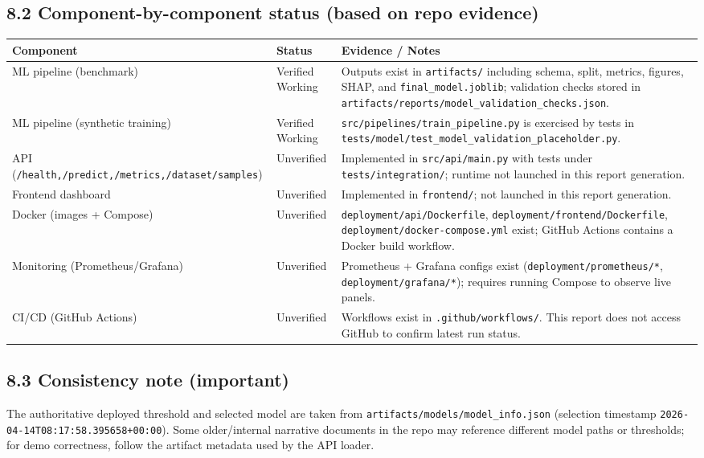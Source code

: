 \documentclass[11pt]{article}
\newcommand{\code}[1]{\texttt{#1}}
\begin{document}
\subsection*{8.2 Component-by-component status (based on repo evidence)}
\begin{longtable}{p{} p{} p{}}
\toprule
\textbf{Component} & \textbf{Status} & \textbf{Evidence / Notes} \\
\midrule
\endhead

ML pipeline (benchmark) & Verified Working & Outputs exist in \code{artifacts/} including schema, split, metrics, figures, SHAP, and \code{final\_model.joblib}; validation checks stored in \code{artifacts/reports/model\_validation\_checks.json}. \\

ML pipeline (synthetic training) & Verified Working & \code{src/pipelines/train\_pipeline.py} is exercised by tests in \code{tests/model/test\_model\_validation\_placeholder.py}. \\

API (\code{/health,/predict,/metrics,/dataset/samples}) & Unverified & Implemented in \code{src/api/main.py} with tests under \code{tests/integration/}; runtime not launched in this report generation. \\

Frontend dashboard & Unverified & Implemented in \code{frontend/}; not launched in this report generation. \\

Docker (images + Compose) & Unverified & \code{deployment/api/Dockerfile}, \code{deployment/frontend/Dockerfile}, \code{deployment/docker-compose.yml} exist; GitHub Actions contains a Docker build workflow. \\

Monitoring (Prometheus/Grafana) & Unverified & Prometheus + Grafana configs exist (\code{deployment/prometheus/*}, \code{deployment/grafana/*}); requires running Compose to observe live panels. \\

CI/CD (GitHub Actions) & Unverified & Workflows exist in \code{.github/workflows/}. This report does not access GitHub to confirm latest run status. \\
\bottomrule
\end{longtable}

\subsection*{8.3 Consistency note (important)}
The authoritative deployed threshold and selected model are taken from \code{artifacts/models/model\_info.json} (selection timestamp \code{2026-04-14T08:17:58.395658+00:00}). Some older/internal narrative documents in the repo may reference different model paths or thresholds; for demo correctness, follow the artifact metadata used by the API loader.
\end{document}
